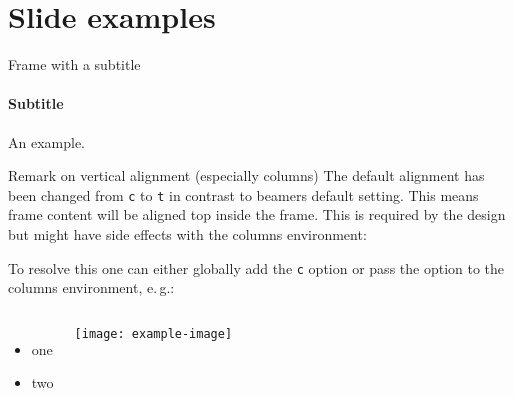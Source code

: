 \documentclass[
	english, %
	design=2023, %
	authorontitle=true,
	]{tudabeamer}
\newcommand*{\code}[1]{\texttt{#1}}
\begin{document}
\section{Slide examples}

\begin{frame}{Frame with a subtitle}
\framesubtitle{Subtitle}
An example.
\end{frame}

\begin{frame}{Remark on vertical alignment (especially columns)}
	The default alignment has been changed from \code{c} to \code{t} in contrast to beamers default setting.
	This means frame content will be aligned top inside the frame. 
	This is required by the design but might have side effects with the columns environment:
	
	To resolve this one can either globally add the \code{c} option or pass the option to the columns environment, e.\,g.:

\begin{columns}[onlytextwidth,c]
	\begin{itemize}
		\item one
		\item two
	\end{itemize}
	\texttt{[image: example-image]}
\end{columns}
\end{frame}
\end{document}

